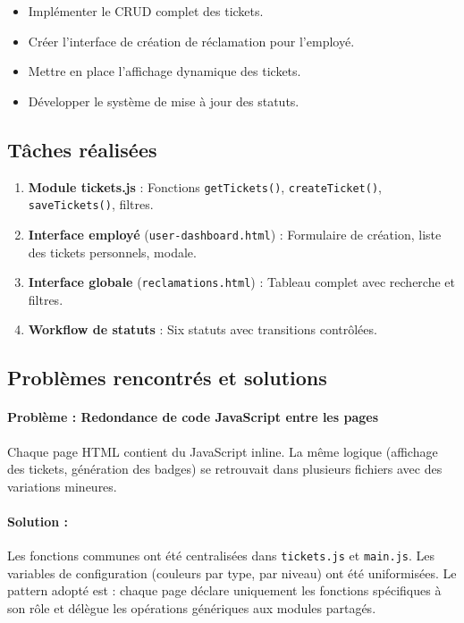 \documentclass[12pt,a4paper,twoside]{report}
\begin{document}
\begin{itemize}
    \item Implémenter le CRUD complet des tickets.
    \item Créer l'interface de création de réclamation pour l'employé.
    \item Mettre en place l'affichage dynamique des tickets.
    \item Développer le système de mise à jour des statuts.
\end{itemize}

\subsection{Tâches réalisées}

\begin{enumerate}
    \item \textbf{Module tickets.js} : Fonctions \texttt{getTickets()}, \texttt{createTicket()}, \texttt{saveTickets()}, filtres.
    \item \textbf{Interface employé} (\texttt{user-dashboard.html}) : Formulaire de création, liste des tickets personnels, modale.
    \item \textbf{Interface globale} (\texttt{reclamations.html}) : Tableau complet avec recherche et filtres.
    \item \textbf{Workflow de statuts} : Six statuts avec transitions contrôlées.
\end{enumerate}

\subsection{Problèmes rencontrés et solutions}

\paragraph{Problème : Redondance de code JavaScript entre les pages}
Chaque page HTML contient du JavaScript inline. La même logique (affichage des tickets, génération des badges) se retrouvait dans plusieurs fichiers avec des variations mineures.

\paragraph{Solution :} Les fonctions communes ont été centralisées dans \texttt{tickets.js} et \texttt{main.js}. Les variables de configuration (couleurs par type, par niveau) ont été uniformisées. Le pattern adopté est : chaque page déclare uniquement les fonctions spécifiques à son rôle et délègue les opérations génériques aux modules partagés.
\end{document}
